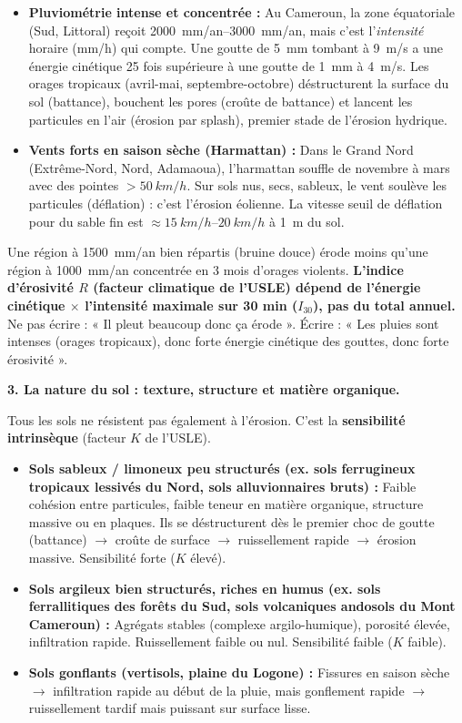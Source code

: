 \documentclass[11pt]{article}
\newcommand{\cle}[1]{{\popxbold\color{popdark}#1}}
\begin{document}
\begin{itemize}
    \item \textbf{Pluviométrie intense et concentrée :} Au Cameroun, la zone équatoriale (Sud, Littoral) reçoit \SIrange{2000}{3000}{mm/an}, mais c'est l'\emph{intensité} horaire (mm/h) qui compte. Une goutte de \SI{5}{mm} tombant à \SI{9}{m/s} a une énergie cinétique 25 fois supérieure à une goutte de \SI{1}{mm} à \SI{4}{m/s}. Les orages tropicaux (avril-mai, septembre-octobre) déstructurent la surface du sol (battance), bouchent les pores (croûte de battance) et lancent les particules en l'air (érosion par splash), premier stade de l'érosion hydrique.
    \item \textbf{Vents forts en saison sèche (Harmattan) :} Dans le Grand Nord (Extrême-Nord, Nord, Adamaoua), l'harmattan souffle de novembre à mars avec des pointes $> \SI{50}{km/h}$. Sur sols nus, secs, sableux, le vent soulève les particules (déflation) : c'est l'érosion éolienne. La vitesse seuil de déflation pour du sable fin est $\approx \SIrange{15}{20}{km/h}$ à \SI{1}{m} du sol.
\end{itemize}

\begin{attention}
Une région à \SI{1500}{mm/an} bien répartis (bruine douce) érode moins qu'une région à \SI{1000}{mm/an} concentrée en 3 mois d'orages violents. \textbf{L'indice d'érosivité $R$ (facteur climatique de l'USLE) dépend de l'énergie cinétique $\times$ l'intensité maximale sur 30 min ($I_{30}$), pas du total annuel.} Ne pas écrire : « Il pleut beaucoup donc ça érode ». Écrire : « Les pluies sont intenses (orages tropicaux), donc forte énergie cinétique des gouttes, donc forte érosivité ».
\end{attention}

\textbf{3. La nature du sol : texture, structure et matière organique.}\par
Tous les sols ne résistent pas également à l'érosion. C'est la \textbf{sensibilité intrinsèque} (facteur $K$ de l'USLE).
\begin{itemize}
    \item \textbf{Sols sableux / limoneux peu structurés (ex. sols ferrugineux tropicaux lessivés du Nord, sols alluvionnaires bruts) :} Faible cohésion entre particules, faible teneur en matière organique, structure massive ou en plaques. Ils se déstructurent dès le premier choc de goutte (battance) $\rightarrow$ croûte de surface $\rightarrow$ ruissellement rapide $\rightarrow$ érosion massive. \cle{Sensibilité forte ($K$ élevé)}.
    \item \textbf{Sols argileux bien structurés, riches en humus (ex. sols ferrallitiques des forêts du Sud, sols volcaniques andosols du Mont Cameroun) :} Agrégats stables (complexe argilo-humique), porosité élevée, infiltration rapide. Ruissellement faible ou nul. \cle{Sensibilité faible ($K$ faible)}.
    \item \textbf{Sols gonflants (vertisols, plaine du Logone) :} Fissures en saison sèche $\rightarrow$ infiltration rapide au début de la pluie, mais gonflement rapide $\rightarrow$ ruissellement tardif mais puissant sur surface lisse.
\end{itemize}
\end{document}
